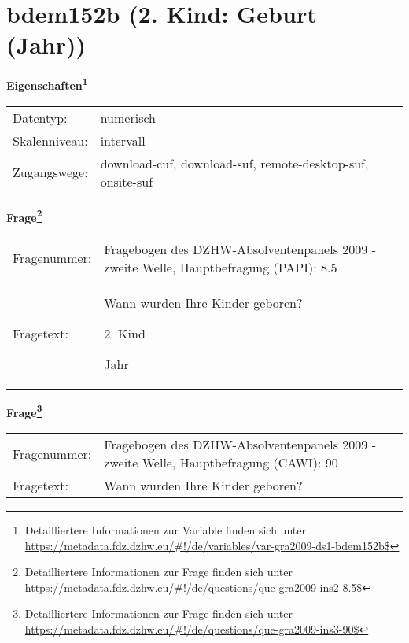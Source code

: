 
    \setcounter{footnote}{0}

    \vspace*{-1.8cm}
	\section{bdem152b (2. Kind: Geburt (Jahr))}
	\label{section:bdem152b}



    \vspace*{0.5cm}
    \noindent\textbf{Eigenschaften\footnote{Detailliertere Informationen zur Variable finden sich unter
		\url{https://metadata.fdz.dzhw.eu/\#!/de/variables/var-gra2009-ds1-bdem152b$}}}\\
	\begin{tabularx}{\hsize}{@{}lX}
	Datentyp: & numerisch \\
	Skalenniveau: & intervall \\
	Zugangswege: &
	  download-cuf, 
	  download-suf, 
	  remote-desktop-suf, 
	  onsite-suf
 \\
    \end{tabularx}



				\vspace*{0.5cm}
                \noindent\textbf{Frage\footnote{Detailliertere Informationen zur Frage finden sich unter
		              \url{https://metadata.fdz.dzhw.eu/\#!/de/questions/que-gra2009-ins2-8.5$}}}\\
				\begin{tabularx}{\hsize}{@{}lX}
					Fragenummer: &
					  Fragebogen des DZHW-Absolventenpanels 2009 - zweite Welle, Hauptbefragung (PAPI):
					  8.5
 \\
					Fragetext: & Wann wurden Ihre Kinder geboren?\par  2. Kind\par  Jahr \\
				\end{tabularx}
				\vspace*{0.5cm}
                \noindent\textbf{Frage\footnote{Detailliertere Informationen zur Frage finden sich unter
		              \url{https://metadata.fdz.dzhw.eu/\#!/de/questions/que-gra2009-ins3-90$}}}\\
				\begin{tabularx}{\hsize}{@{}lX}
					Fragenummer: &
					  Fragebogen des DZHW-Absolventenpanels 2009 - zweite Welle, Hauptbefragung (CAWI):
					  90
 \\
					Fragetext: & Wann wurden Ihre Kinder geboren? \\
				\end{tabularx}





